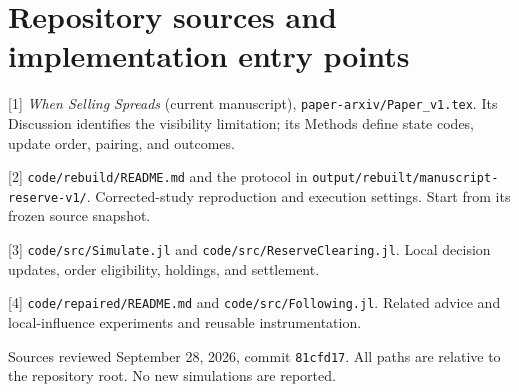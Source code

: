 \documentclass[11pt,letterpaper]{article}
\newcommand{\codepath}[1]{{\footnotesize\nolinkurl{#1}}}
\begin{document}
\section{Repository sources and implementation entry points}
{\footnotesize\setlength{\parskip}{4pt}
[1] \emph{When Selling Spreads} (current manuscript), \codepath{paper-arxiv/Paper_v1.tex}. Its Discussion identifies the visibility limitation; its Methods define state codes, update order, pairing, and outcomes.

[2] \codepath{code/rebuild/README.md} and the protocol in \codepath{output/rebuilt/manuscript-reserve-v1/}. Corrected-study reproduction and execution settings. Start from its frozen source snapshot.

[3] \codepath{code/src/Simulate.jl} and \codepath{code/src/ReserveClearing.jl}. Local decision updates, order eligibility, holdings, and settlement.

[4] \codepath{code/repaired/README.md} and \codepath{code/src/Following.jl}. Related advice and local-influence experiments and reusable instrumentation.

\textcolor{muted}{Sources reviewed September 28, 2026, commit \texttt{81cfd17}. All paths are relative to the repository root. No new simulations are reported.}
}
\end{document}
